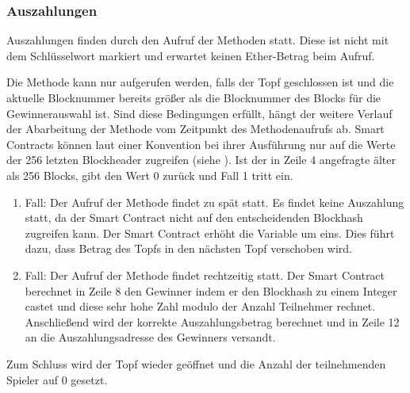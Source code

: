 \subsubsection{Auszahlungen}\label{sssec:eth_nbrOfMissedPayouts}
Auszahlungen finden durch den Aufruf der  Methoden statt. Diese ist nicht mit dem Schlüsselwort  markiert und erwartet keinen Ether-Betrag beim Aufruf.

Die Methode kann nur aufgerufen werden, falls der Topf geschlossen ist und die aktuelle Blocknummer bereits größer als die Blocknummer des Blocks für die Gewinnerauswahl ist. Sind diese Bedingungen erfüllt, hängt der weitere Verlauf der Abarbeitung der  Methode vom Zeitpunkt des Methodenaufrufs ab. Smart Contracts können laut einer Konvention bei ihrer Ausführung nur auf die Werte der 256 letzten Blockheader zugreifen (siehe \cite{doc_solidity_global_var}). Ist der in Zeile 4 angefragte  älter als 256 Blocks, gibt  den Wert 0 zurück und Fall 1 tritt ein.
\begin{enumerate}
\item Fall: Der Aufruf der  Methode findet zu spät statt. Es findet keine Auszahlung statt, da der Smart Contract nicht auf den entscheidenden Blockhash zugreifen kann. Der Smart Contract erhöht die  Variable um eins. Dies führt dazu, dass Betrag des Topfs in den nächsten Topf verschoben wird. 
\item Fall: Der Aufruf der  Methode findet rechtzeitig statt. Der Smart Contract berechnet in Zeile 8 den Gewinner indem er den Blockhash zu einem Integer castet und diese sehr hohe Zahl modulo der Anzahl Teilnehmer rechnet. Anschließend wird der korrekte Auszahlungsbetrag berechnet und in Zeile 12 an die Auszahlungsadresse des Gewinners versandt.
\end{enumerate}
Zum Schluss wird der Topf wieder geöffnet und die Anzahl der teilnehmenden Spieler auf 0 gesetzt.

